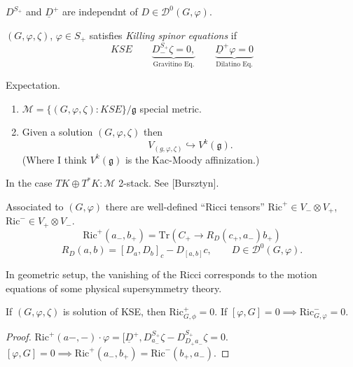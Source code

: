 {\begin{lemma}
\label{lemma-independendant}
$D^{S_+}$ and $\underline{D}^+$ are independnt of
$D \in \mathcal{D}^0(G,\varphi)$.
\end{lemma}

\begin{definition}
\label{definition-Killing-spinor-equations}
$(G,\varphi,\zeta)$, $\varphi \in S_+$ satisfies
{\it Killing spinor equations} if
$$
KSE\qquad \underbrace{D_-^{S_+}\zeta=0,}_{\text{Gravitino Eq.}}\qquad 
\underbrace{\underline{D}^+\varphi=0
}_{\text{Dilatino Eq.}}$$
\end{definition}

Expectation.
\begin{enumerate}
\item $\mathcal{M}=\{(G,\varphi,\zeta):KSE\}/\mathfrak{g}$ special metric.
\item Given a solution $(G,\varphi,\zeta)$
then 
$$
V_{(g,\varphi,\zeta)}\hookrightarrow V^k(\mathfrak{g}).
$$
(Where I think $V^k(\mathfrak{g})$ is the Kac-Moody affinization.)
\end{enumerate}

\begin{remark}
\label{remark-Lie-algebra}
In the case $T K \oplus T^*K: \mathcal{M}$ 2-stack. See [Bursztyn].
\end{remark}

\begin{lemma}
\label{lemma-Ricci-tensors}
Associated to $(G,\varphi)$ there are
well-defined ``Ricci tensors''
$\text{Ric}^+ \in V_- \otimes V_+$,
$\text{Ric}^- \in V_+ \otimes V_-$.
$$
\text{Ric}^+(a_-,b_+)=\text{Tr}(C_+ \to R_D(c_+,a_-)b_+)
$$
$$
R_D(a,b)=[D_a,D_b]_c-D_{[a,b]}c,\qquad D \in \mathcal{D}^0(G,\varphi).
$$
\begin{remark}
\label{remark-in-geometric-setup}
In geometric setup, the vanishing of the Ricci corresponds to
the motion equations of some physical supersymmetry theory.
\end{remark}

\begin{proposition}
\label{proposition-KSE}
If $(G,\varphi,\zeta)$ is solution of KSE, then
 $\text{Ric}^+_{G,\phi}=0$.
If $[\varphi,G]=0 \implies \text{Ric}^-_{G,\varphi}=0$.
\end{proposition}
\end{lemma}

\begin{proof}
$\text{Ric}^+(a-,-)\cdot \varphi=[\underline{D}^+,D_{a_-}^{S_+}\zeta
-D_{D_+a_-}^{S_+}\zeta=0$.
$[\varphi,G]=0 \implies  \text{Ric}^+(a_-,b_+)=\text{Ric}^-(b_+,a_-)$.
\end{proof}

}
